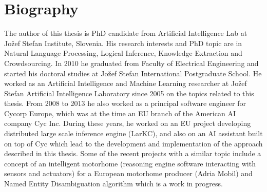 % 
\chapter{Biography}

The author of this thesis is PhD candidate from Artificial Intelligence Lab at 
Jožef Stefan Institute, Slovenia. His research interests and PhD topic are in 
Natural Language Processing, Logical Inference, Knowledge Extraction and
Crowdsourcing. In 2010 he graduated from Faculty of Electrical Engineering and
started his doctoral studies at Jožef Stefan International Postgraduate School.
He worked as an Artificial Intelligence and Machine Learning researcher at
Jožef Stefan Artificial Intelligence Laboratory since 2005 on the topics related
to this thesis. From 2008 to 2013 he also worked as a principal software 
engineer for Cycorp Europe, which was at the time an EU branch of the American 
AI company Cyc Inc. During these years, he worked on an EU project developing 
distributed large scale inference engine (LarKC), and also on an AI assistant 
built on top of Cyc which lead to the development and implementation of the
approach described in this thesis. Some of the recent projects with a similar
topic include a concept of an intelligent motorhome (reasoning engine software 
interacting with sensors and actuators) for a European motorhome producer 
(Adria Mobil) and Named Entity Disambiguation algorithm which is a work in 
progress.

